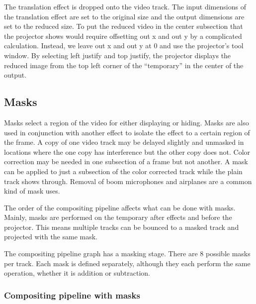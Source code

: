 The translation effect is dropped onto the video track. The input dimensions of the translation effect are set to the original size and the output dimensions are set to the reduced size. 
To put the reduced video in the center subsection that the projector shows would require offsetting out x and out y by a complicated calculation. 
Instead, we leave out x and out y at 0 and use the projector's tool window. 
By selecting left justify and top justify, the projector displays the reduced image from the top left corner of the “temporary” in the center of the output.

\subsection{Masks}%
\label{sub:masks}

Masks select a region of the video for either displaying or hiding. 
Masks are also used in conjunction with another effect to isolate the effect to a certain region of the frame. 
A copy of one video track may be delayed slightly and unmasked in locations where the one copy has interference but the other copy does not. 
Color correction may be needed in one subsection of a frame but not another. 
A mask can be applied to just a subsection of the color corrected track while the plain track shows through. 
Removal of boom microphones and airplanes are a common kind of mask uses.

The order of the compositing pipeline affects what can be done with masks. Mainly, masks are performed on the temporary after effects and before the projector. This means multiple tracks can be bounced to a masked track and projected with the same mask.

The compositing pipeline graph has a masking stage. 
There are 8 possible masks per track. Each mask is defined separately, although they each perform the same operation, whether it is addition or subtraction.

\subsubsection*{Compositing pipeline with masks}%
\label{ssub:compositing_pipeline_with_masks}

